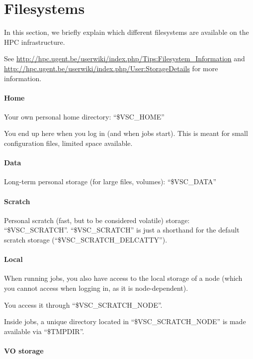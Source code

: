 \chapter{Filesystems}

In this section, we briefly explain which different filesystems are available on
the HPC infrastructure.

See \url{http://hpc.ugent.be/userwiki/index.php/Tips:Filesystem_Information} and
\url{http://hpc.ugent.be/userwiki/index.php/User:StorageDetails} for more
information.

\subsubsection{Home}

Your own personal home directory: ``\$VSC\_HOME''

You end up here when you log in (and when jobs start). This is meant for small
configuration files, limited space available.

\subsubsection{Data}

Long-term personal storage (for large files, volumes): ``\$VSC\_DATA''

\subsubsection{Scratch}

Personal scratch (fast, but to be considered volatile) storage:
``\$VSC\_SCRATCH''. ``\$VSC\_SCRATCH'' is just a short\-hand for the default
scratch storage (``\$VSC\_SCRATCH\_DELCATTY'').

\subsubsection{Local}

When running jobs, you also have access to the local storage of a node (which
you cannot access when logging in, as it is node-dependent).

You access it through ``\$VSC\_SCRATCH\_NODE''.

Inside jobs, a unique directory located in ``\$VSC\_SCRATCH\_NODE'' is made
available via ``\$TMPDIR''.

\subsubsection{VO storage}

